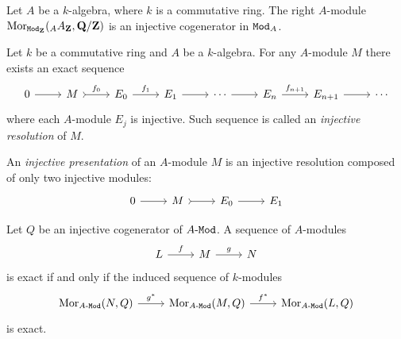 \begin{proposition}
\label{prop:every-cat-modA-has-inj-cogenerator}
Let \(A\) be a \(k\)-algebra, where \(k\) is a commutative ring. The
right \(A\)-module \(\operatorname{Mor}_{{\texttt{Mod}_{\mathbf{Z}}}}({}_AA_{\mathbf{Z}}, \mathbf{Q}/\mathbf{Z})\) is an injective cogenerator
in \({\texttt{Mod}_{A}}\).
\end{proposition}

\begin{proposition}
\label{prop:injective-resolution}
Let \(k\) be a commutative ring and \(A\) be a \(k\)-algebra. For any
\(A\)-module \(M\) there exists an exact sequence
\[
\begin{tikzcd}
0 \ar[r]
&M \ar[r, tail, "f_0"]
&E_0 \ar[r, "f_1"]
&E_1 \ar[r]
&\cdots \ar[r]
&E_n \ar[r, "f_{n+1}"]
&E_{n+1} \ar[r]
&\cdots
\end{tikzcd}
\]
where each \(A\)-module \(E_j\) is injective. Such sequence is called an
\emph{injective resolution} of \(M\).
\end{proposition}

\begin{definition}
\label{def:injective-presentation}
An \emph{injective presentation} of an \(A\)-module \(M\) is an injective
resolution composed of only two injective modules:
\[
\begin{tikzcd}
0 \ar[r] &M \ar[r, tail] &E_0 \ar[r] &E_1
\end{tikzcd}
\]
\end{definition}

\begin{lemma}
\label{lem:exact-iff-induced-inj-cogenerator-hom-fct}
Let \(Q\) be an injective cogenerator of \({A\text{-}\texttt{Mod}}\). A sequence of \(A\)-modules
\[
\begin{tikzcd}
L \ar[r, "f"] &M \ar[r, "g"] &N
\end{tikzcd}
\]
is exact if and only if the induced sequence of \(k\)-modules
\[
\begin{tikzcd}
\Mor_{\Mod A}(N, Q) \ar[r, "g^{*}"]
&\Mor_{\Mod A}(M, Q) \ar[r, "f^{*}"]
&\Mor_{\Mod A}(L, Q)
\end{tikzcd}
\]
is exact.
\end{lemma}

